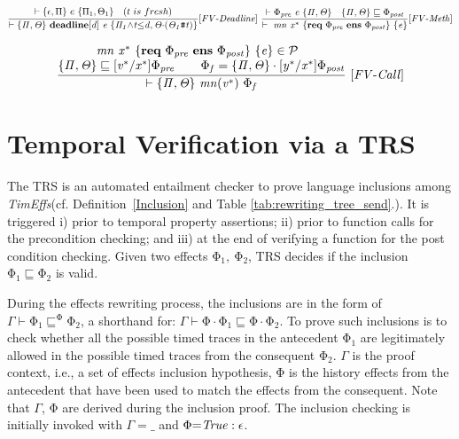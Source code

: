 \documentclass[acmsmall,10pt,review]{acmart}
\newcommand{\timedEffects}{\emph{TimEffs}}
\newcommand{\effect}{{\ensuremath{\mathrm{\Phi}}}}
\newcommand{\code}[1]{{\tt{\ensuremath{\m{#1}}}}}
\newcommand{\empt}{\textcolor{black}{\ensuremath{\epsilon}}}
\newcommand{\CONTAIN}{\sqsubseteq}
\newcommand{\m}{\mathit}
\newcommand{\mysharp}{{\mathrel{\texttt{\#}}}}
\newcommand\tabref[1]{Table \textcolor{black}{\ref{#1}}.}
\newcommand\defref[1]{Definition~\textcolor{blue}{\ref{#1}}}
\begin{document}
{{{\small\begin{gather*}
  \code{\frac{
    \begin{matrix}
      \vdash \{ \epsilon, \Pi \}\ e \ \{  \Pi_1, \Theta_1\} 
  \quad (t\ is\ fresh)     
\end{matrix}
  }
  {\vdash \s{ \Pi, \Theta} \  
  \textbf{deadline}  [d] \ e 
   \ \s{\Pi_1 {\wedge}t{\leq}d, \Theta {\cdot}(\Theta_1\mysharp t)} }   
    {[FV\text{-}Deadline]}} 
\ 
\code{\frac{  \vdash \effect_{pre} 
 \ e \  \{ \Pi, \Theta \} \quad   \{ \Pi, \Theta \} \CONTAIN  
  \effect_{post}}{  \vdash  \ mn  \ {x^*}\ \{\textbf{req}\ \effect_{pre}\ 
  \textbf{ens}\  \effect_{post}\} \ \{ e \}}   {[FV\text{-}Meth]}}  
  \end{gather*}}}




{{\small\begin{gather*}
\code{\frac{
\begin{matrix}
{\code{  mn  \ {x^*}\ \{\textbf{req}\ \effect_{pre}\ \textbf{ens}\  \effect_{post}\} \ \{ e \} \in \mathcal{P}\ \ }}
\\
\text{\code{ \s{ \Pi, \Theta} \CONTAIN [v^*/x^*] \effect_{pre}   
\qquad   \effect_f =  \s{ \Pi, \Theta} \cdot  [y^*/x^*]\effect_{post}}}
\end{matrix}}
{\vdash \s{ \Pi, \Theta} \ mn({v^*})  \ 
\effect_f} \ {[FV\text{-}Call]}}
\end{gather*}}}



\section{Temporal Verification via a TRS}
\label{sec:Entailment_Prover}


The TRS  is an automated entailment checker to prove language inclusions among \timedEffects (cf. \defref{Inclusion} and \tabref{tab:rewriting_tree_send}). It is triggered i) prior to temporal property assertions; ii) prior to function calls for the precondition checking; and iii) at the end of verifying a function for the post condition checking. Given two effects \code{\effect_1,\ \effect_2}, TRS decides if the inclusion \code{\effect_1 \CONTAIN  \effect_2 } is valid. 

During the effects rewriting process, the inclusions are in the form of \code{\Gamma \vdash  \effect_1 \CONTAIN^{\effect}  \effect_2 }, a shorthand for: \code{\Gamma \vdash  \effect \cdot \effect_1 \CONTAIN   \effect \cdot  \effect_2}. To prove such inclusions is to check whether all the possible timed traces in the antecedent \code{\effect_1} are legitimately allowed  in the possible timed traces from the consequent \code{\effect_2}.
\code{\Gamma} is the proof context, i.e., a set of effects inclusion hypothesis, \code{\effect} is the history effects from the antecedent that have been used to match the effects from the consequent.
Note that \code{\Gamma}, \code{\effect} are derived during the inclusion proof. 
The inclusion checking is initially invoked with \code{\Gamma{=}\_} and \code{\effect{=} True : \empt}. 







}
\end{document}
